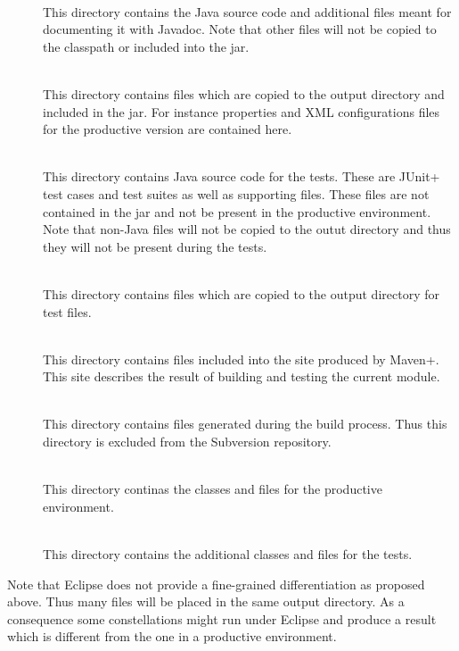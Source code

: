 \begin{description}
\item[] \ \\
  This directory contains the Java source code and additional files
  meant for documenting it with Javadoc. Note that other files will
  not be copied to the classpath or included into the jar.
\item[] \ \\
  This directory contains files which are copied to the output
  directory and included in the jar. For instance properties and XML
  configurations files for the productive version are contained here.
\item[] \ \\
  This directory contains Java source code for the tests. These are
  \+JUnit+ test cases and test suites as well as supporting files.
  These files are not contained in the jar and not be present in the
  productive environment. Note that non-Java files will not be copied
  to the outut directory and thus they will not be present during the
  tests.
\item[] \ \\
  This directory contains files which are copied to the output
  directory for test files.
\item[] \ \\
  This directory contains files included into the site produced by
  \+Maven+. This site describes the result of building and testing the
  current module.
\item[] \ \\
  This directory contains files generated during the build process.
  Thus this directory is excluded from the Subversion repository.
\item[] \ \\
  This directory continas the classes and files for the productive
  environment.
\item[] \ \\
  This directory contains the additional classes and files for the
  tests.
\end{description}

Note that Eclipse does not provide a fine-grained differentiation as
proposed above. Thus many files will be placed in the same output
directory. As a consequence some constellations might run under
Eclipse and produce a result which is different from the one in a
productive environment.

